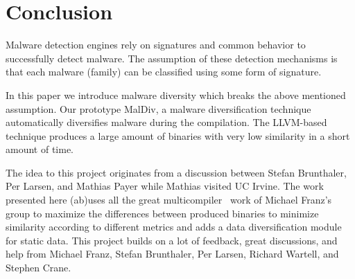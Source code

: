 \documentclass[10pt, preprint]{sigplanconf}
\begin{document}
\section{Conclusion}\label{sec:concl}

Malware detection engines rely on signatures and common behavior to
successfully detect malware. The assumption of these detection mechanisms is
that each malware (family) can be classified using some form of signature.

In this paper we introduce malware diversity which breaks the above mentioned
assumption. Our prototype MalDiv, a malware diversification technique
automatically diversifies malware during the compilation. The LLVM-based
technique produces a large amount of binaries with very low similarity in a
short amount of time.

\acks

The idea to this project originates from a discussion between Stefan Brunthaler,
Per Larsen, and Mathias Payer while Mathias visited UC Irvine. The work
presented here (ab)uses all the great multicompiler~\cite{multicompiler} work of
Michael Franz's group to maximize the differences between produced binaries to
minimize similarity according to different metrics and adds a data
diversification module for static data. This project builds on a lot of
feedback, great discussions, and help from Michael Franz, Stefan Brunthaler, Per
Larsen, Richard Wartell, and Stephen Crane.


{%
\linespread{0.85}


}
\end{document}
